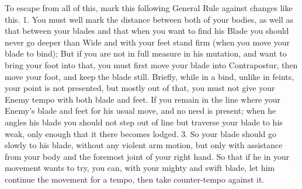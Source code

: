 To escape from all of this, mark this following General Rule against
changes like this. 1. You must well mark the distance between both of
your bodies, as well as that between your blades and that when you
want to find his Blade you should never go deeper than Wide
and with your feet stand firm (when you move your blade to bind); But
if you are not in full measure in his mutation, and want to bring your
foot into that, you must first move your blade into Contrapostur, 
then move your foot, and keep the blade still. Briefly, while
in a bind, unlike in feints, your point is not presented, but mostly
out of that, you must not give your Enemy tempo with both blade and
feet. If you remain in the line where your Enemy's blade and feet for
his usual move, and no need is present; when he angles his blade you
should not step out of line but traverse your blade to his weak, only
enough that it there becomes lodged. 3. So your blade should go
slowly to his blade, without any violent arm motion, but only with assistance from
your body and the foremost joint of your right hand. So that if he in
your movement wants to try, you can, with your mighty and
swift blade, let him continue the movement for a tempo, then take
counter-tempo against it.
